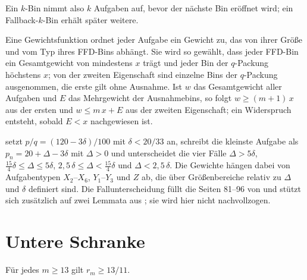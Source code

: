 Ein $k$-Bin nimmt also $k$ Aufgaben auf, bevor der nächste Bin eröffnet wird; ein
Fallback-$k$-Bin erhält später weitere.

Eine Gewichtsfunktion ordnet jeder Aufgabe ein Gewicht zu, das von ihrer Größe und vom Typ ihres
FFD-Bins abhängt.
Sie wird so gewählt, dass jeder FFD-Bin ein Gesamtgewicht von mindestens $x$ trägt und jeder Bin
der $q$-Packung höchstens $x$; von der zweiten Eigenschaft sind einzelne Bins der $q$-Packung
ausgenommen, die erste gilt ohne Ausnahme.
Ist $w$ das Gesamtgewicht aller Aufgaben und $E$ das Mehrgewicht der Ausnahmebins, so folgt
$w \ge (m+1)\,x$ aus der ersten und $w \le m\,x + E$ aus der zweiten Eigenschaft; ein Widerspruch
entsteht, sobald $E < x$ nachgewiesen ist.

\textcite{cao1995} setzt $p/q = (120 - 3\delta)/100$ mit $\delta < 20/33$ an, schreibt die
kleinste Aufgabe als $p_n = 20 + \Delta - 3\delta$ mit $\Delta > 0$ und unterscheidet die vier
Fälle $\Delta > 5\delta$, $\frac{15}{4}\delta \le \Delta \le 5\delta$,
$2{,}5\,\delta \le \Delta < \frac{15}{4}\delta$ und $\Delta < 2{,}5\,\delta$.
Die Gewichte hängen dabei von Aufgabentypen $X_2$--$X_6$, $Y_1$--$Y_3$ und $Z$ ab, die über
Größenbereiche relativ zu $\Delta$ und $\delta$ definiert sind.
Die Fallunterscheidung füllt die Seiten 81--96 von \cite{cao1995} und stützt sich zusätzlich auf
zwei Lemmata aus \cite{yue1990}; sie wird hier nicht nachvollzogen.

\section{Untere Schranke}
\label{sec:untere-schranke}

\begin{lemma}
\label{lem:untere-schranke}
Für jedes $m \ge 13$ gilt $r_m \ge 13/11$.
\end{lemma}

